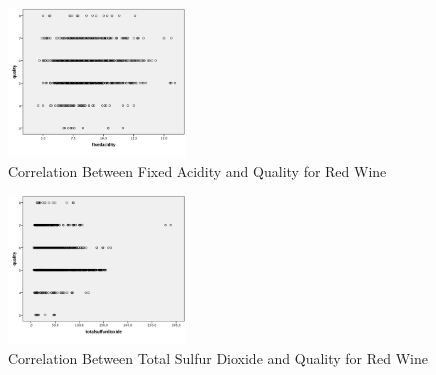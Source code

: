   \begin{figure}[htb]

  \centering  %

  \includegraphics[width=0.42\textwidth]{2.png}

  \caption{Correlation Between Fixed Acidity and Quality for Red Wine}

  \label{fig:tex}

  \end{figure}
   \begin{figure}[htb]

  \centering  %

  \includegraphics[width=0.42\textwidth]{3.png}

  \caption{Correlation Between Total Sulfur Dioxide and Quality for Red Wine}

  \label{fig:tex}

  \end{figure}
  
